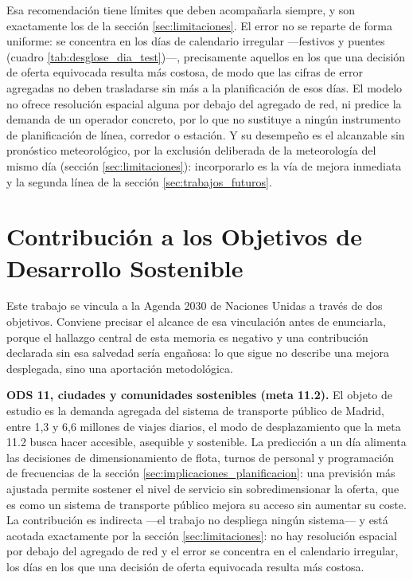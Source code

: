 Esa recomendación tiene límites que deben acompañarla siempre, y son exactamente los de
la sección \ref{sec:limitaciones}. El error no se reparte de forma uniforme: se concentra
en los días de calendario irregular ---festivos y puentes (cuadro
\ref{tab:desglose_dia_test})---, precisamente aquellos en los que una decisión de oferta
equivocada resulta más costosa, de modo que las cifras de error agregadas no deben
trasladarse sin más a la planificación de esos días. El modelo no ofrece resolución
espacial alguna por debajo del agregado de red, ni predice la demanda de un operador
concreto, por lo que no sustituye a ningún instrumento de planificación de línea,
corredor o estación. Y su desempeño es el alcanzable sin pronóstico meteorológico, por la
exclusión deliberada de la meteorología del mismo día (sección \ref{sec:limitaciones}):
incorporarlo es la vía de mejora inmediata y la segunda línea de la sección
\ref{sec:trabajos_futuros}.

\section{Contribución a los Objetivos de Desarrollo Sostenible}\label{sec:ods}

Este trabajo se vincula a la Agenda 2030 de Naciones Unidas a través de dos objetivos.
Conviene precisar el alcance de esa vinculación antes de enunciarla, porque el hallazgo
central de esta memoria es negativo y una contribución declarada sin esa salvedad sería
engañosa: lo que sigue no describe una mejora desplegada, sino una aportación
metodológica.

\textbf{ODS 11, ciudades y comunidades sostenibles (meta 11.2).} El objeto de estudio es
la demanda agregada del sistema de transporte público de Madrid, entre 1,3 y 6,6 millones
de viajes diarios, el modo de desplazamiento que la meta 11.2 busca hacer accesible,
asequible y sostenible. La predicción a un día alimenta las decisiones de
dimensionamiento de flota, turnos de personal y programación de frecuencias de la sección
\ref{sec:implicaciones_planificacion}: una previsión más ajustada permite sostener el
nivel de servicio sin sobredimensionar la oferta, que es como un sistema de transporte
público mejora su acceso sin aumentar su coste. La contribución es indirecta ---el
trabajo no despliega ningún sistema--- y está acotada exactamente por la sección
\ref{sec:limitaciones}: no hay resolución espacial por debajo del agregado de red y el
error se concentra en el calendario irregular, los días en los que una decisión de oferta
equivocada resulta más costosa.

